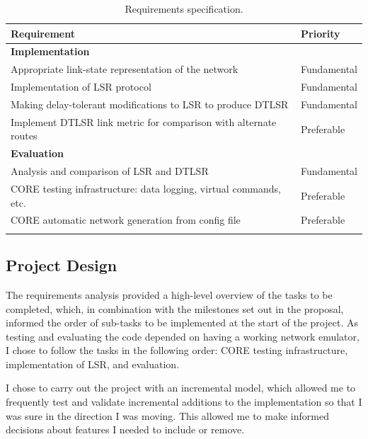\documentclass[withindex,glossary,openany]{cam-thesis}
\begin{document}
\begin{table}[H]
\centering
\begin{tabular}{@{}p{}l@{}}\toprule
\Large\textbf{Requirement} & \Large\textbf{Priority} \\
\midrule
\midrule
\textbf{Implementation} & \\
\midrule
Appropriate link-state representation of the network & Fundamental \\\addlinespace[0.2em]
Implementation of LSR protocol & Fundamental \\\addlinespace[0.2em]
Making delay-tolerant modifications to LSR to produce DTLSR & Fundamental \\\addlinespace[0.2em]
Implement DTLSR link metric for comparison with alternate routes & Preferable \\\addlinespace[0.2em]
\midrule
\midrule
\textbf{Evaluation} & \\
\midrule
Analysis and comparison of LSR and DTLSR & Fundamental \\\addlinespace[0.2em]
CORE testing infrastructure: data logging, virtual commands, etc. & Preferable \\\addlinespace[0.2em]
CORE automatic network generation from config file & Preferable \\\addlinespace[0.2em]
\bottomrule
\end{tabular}
\caption{Requirements specification.}
\label{table:requirements}
\end{table}

\subsection{Project Design}

The requirements analysis provided a high-level overview of the tasks to be completed, which, in combination with the milestones set out in the proposal, informed the order of sub-tasks to be implemented at the start of the project. As testing and evaluating the code depended on having a working network emulator, I chose to follow the tasks in the following order: CORE testing infrastructure, implementation of LSR, and evaluation.

I chose to carry out the project with an incremental model, which allowed me to frequently test and validate incremental additions to the implementation so that I was sure in the direction I was moving. This allowed me to make informed decisions about features I needed to include or remove.
\end{document}

